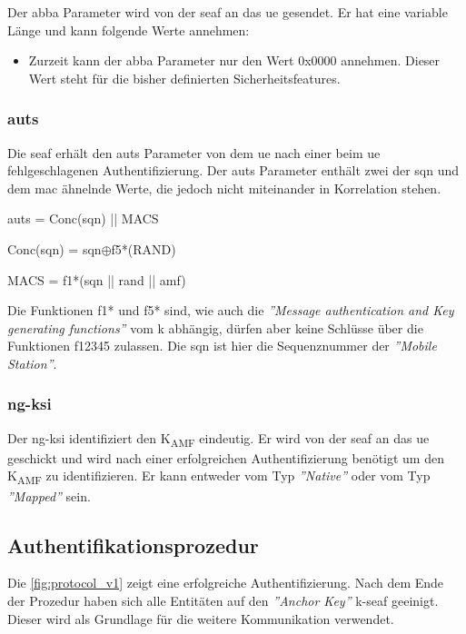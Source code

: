 Der \gls{abba} Parameter wird von der \gls{seaf} an das \gls{ue} gesendet.
Er hat eine variable L\"ange und kann folgende Werte annehmen:
\begin{itemize}
\item Zurzeit kann der \gls{abba} Parameter nur den Wert 0x0000 annehmen. Dieser Wert steht f\"ur die bisher definierten Sicherheitsfeatures. %
\end{itemize}

\subsubsection{\gls{auts}}
Die \gls{seaf} erh\"alt den \gls{auts} Parameter von dem \gls{ue} nach einer beim \gls{ue} fehlgeschlagenen Authentifizierung.
Der \gls{auts} Parameter enth\"alt zwei der \gls{sqn} und dem \gls{mac} \"ahnelnde Werte, die jedoch nicht miteinander in Korrelation stehen. %

\gls{auts} = Conc(\gls{sqn}) || MACS

Conc(\gls{sqn}) = \gls{sqn}$ \oplus $f5*(RAND)

MACS = f1*(\gls{sqn} || \gls{rand} || \gls{amf})

Die Funktionen f1* und f5* sind, wie auch die \textit{''Message authentication and Key generating functions''} vom \gls{k} abh\"angig, d\"urfen aber keine Schl\"usse \"uber die Funktionen \gls{f12345} zulassen.
Die \gls{sqn} ist hier die Sequenznummer der \textit{''Mobile Station''}.

\subsubsection{\gls{ng-ksi}}
Der \gls{ng-ksi} identifiziert den K\textsubscript{AMF} eindeutig.%
Er wird von der \gls{seaf} an das \gls{ue} geschickt und wird nach einer erfolgreichen Authentifizierung ben\"otigt um den K\textsubscript{AMF} zu identifizieren.
Er kann entweder vom Typ \textit{''Native''} oder vom Typ \textit{''Mapped''} sein.%


\subsection{Authentifikationsprozedur}

Die \cref{fig:protocol_v1} zeigt eine erfolgreiche Authentifizierung.
Nach dem Ende der Prozedur haben sich alle Entit\"aten auf den \textit{''Anchor Key''} \gls{k-seaf} geeinigt.
Dieser wird als Grundlage f\"ur die weitere Kommunikation verwendet.

